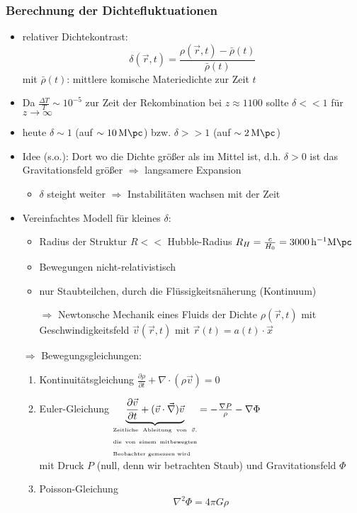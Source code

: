 \subsubsection{Berechnung der Dichtefluktuationen}
\begin{itemize}
	\item relativer Dichtekontrast:
		\begin{equation*}
			\delta(\vec{r},t)=\frac{\rho(\vec{r},t)-\bar{\rho}(t)}{\bar{\rho}(t)}
		\end{equation*}
		mit $\bar{\rho}(t)$: mittlere komische Materiedichte zur Zeit $t$
	\item Da $\frac{\Delta T}{T}\sim 10^{-5}$ zur Zeit der Rekombination bei $z\approx\num{1100}$ sollte $\delta << 1$ für $z\to\infty$
	\item heute $\delta\sim 1$ (auf $\sim\SI{10}{M\pc}$) bzw. $\delta >> 1$ (auf $\sim\SI{2}{M\pc}$)
	\item Idee (s.o.): Dort wo die Dichte größer als im Mittel ist, d.h. $\delta>0$ ist das Gravitationsfeld größer $\Rightarrow$ langsamere Expansion
		\begin{itemize}
			\item $\delta$ steight weiter $\Rightarrow$ Instabilitäten wachsen mit der Zeit
		\end{itemize}
	\item Vereinfachtes Modell für kleines $\delta$:
		\begin{itemize}[label={$\cdot$}]
			\item Radius der Struktur $R<<$ Hubble-Radius $R_H=\frac{c}{H_0}=\SI{3000}{h^{-1}M\pc}$
			\item Bewegungen nicht-relativistisch
			\item nur Staubteilchen, durch die Flüssigkeitsnäherung (Kontinuum)
			\item[$\Rightarrow$] Newtonsche Mechanik eines Fluids der Dichte $\rho(\vec{r},t)$ mit Geschwindigkeitsfeld $\vec{v}(\vec{r},t)$ mit $\vec{r}(t)=a(t)\cdot\vec{x}$
		\end{itemize}
	\item[$\Rightarrow$] Bewegungsgleichungen:
		\begin{enumerate}[label={(\arabic*)}]
			\item Kontinuitätsgleichung $\frac{\partial\rho}{\partial t}+\nabla\cdot(\rho\vec{v})=0$
			\item Euler-Gleichung $\underset{\begin{minipage}{3cm}\begin{tiny}Zeitliche Ableitung von $\vec{v}$, die von einem mitbewegten Beobachter gemessen wird\end{tiny}\end{minipage}}{\underbrace{\frac{\partial\vec{v}}{\partial t}+(\vec{v}\cdot\vec{\nabla})\vec{v}}}=-\frac{\nabla P\tikz[remember picture]{\coordinate (Druck) at (0,0);}}{\rho}-\nabla\Phi$\\
				mit Druck $P$ (null, denn wir betrachten Staub) und Gravitationsfeld $\Phi$
			\item Poisson-Gleichung
				\begin{equation*}
					\nabla^2\Phi =4\pi G\rho
				\end{equation*}
		\end{enumerate}
\end{itemize}
